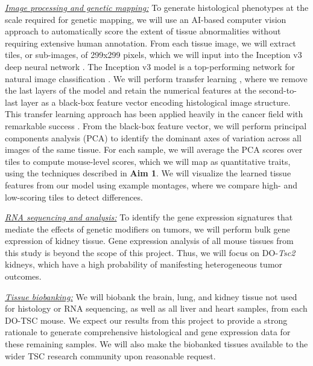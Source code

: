 \documentclass[
  12pt,
]{article}
\begin{document}
\textit{\underline{Image processing and genetic mapping:}} To generate
histological phenotypes at the scale required for genetic mapping, we
will use an AI-based computer vision approach to automatically score the
extent of tissue abnormalities without requiring extensive human
annotation. From each tissue image, we will extract tiles, or
sub-images, of 299x299 pixels, which we will input into the Inception v3
deep neural network \cite{inception}. The Inception v3 model is a
top-performing network for natural image classification
\cite{farooq2020advanced}. We will perform transfer learning
\cite{dutta2022multi}, where we remove the last layers of the model and
retain the numerical features at the second-to-last layer as a black-box
feature vector encoding histological image structure. This transfer
learning approach has been applied heavily in the cancer field with
remarkable success \cite{31010833, 32968067}. From the black-box feature
vector, we will perform principal components analysis (PCA) to identify
the dominant axes of variation across all images of the same tissue. For
each sample, we will average the PCA scores over tiles to compute
mouse-level scores, which we will map as quantitative traits, using the
techniques described in \textbf{Aim 1}. We will visualize the learned
tissue features from our model using example montages, where we compare
high- and low-scoring tiles to detect differences.

\textit{\underline{RNA sequencing and analysis:}} To identify the gene
expression signatures that mediate the effects of genetic modifiers on
tumors, we will perform bulk gene expression of kidney tissue. Gene
expression analysis of all mouse tissues from this study is beyond the
scope of this project. Thus, we will focus on DO-\textit{Tsc2} kidneys,
which have a high probability of manifesting heterogeneous tumor
outcomes.

\textit{\underline{Tissue biobanking:}} We will biobank the brain, lung,
and kidney tissue not used for histology or RNA sequencing, as well as
all liver and heart samples, from each DO-TSC mouse. We expect our
results from this project to provide a strong rationale to generate
comprehensive histological and gene expression data for these remaining
samples. We will also make the biobanked tissues available to the wider
TSC research community upon reasonable request.
\end{document}
